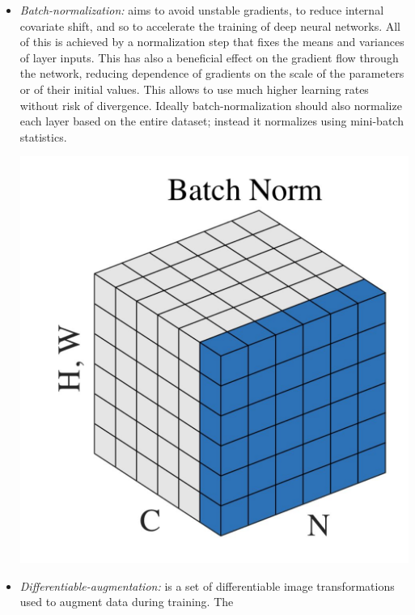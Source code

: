 \documentclass[12pt]{article}
\begin{document}
\begin{itemize}
	\item {	
		\vspace{-4cm}
		\begin{minipage}[t]{0.7\textwidth}
			\textit{Batch-normalization:} aims to avoid unstable gradients, to reduce internal covariate shift, and so to accelerate the 
			training of deep neural networks. All of this is achieved by a normalization step that fixes the means and variances of layer inputs.
			This has also a beneficial effect on the gradient flow through the network, reducing dependence of gradients on the scale of the 
			parameters or of their initial values. This allows to use much higher learning rates without risk of divergence.
			Ideally batch-normalization should also normalize each layer based on the entire dataset; instead it normalizes using mini-batch statistics.
		\end{minipage}
		\hspace{0.02\linewidth}
		\begin{minipage}{0.2\textwidth} 
			\vspace{5cm}
			\includegraphics[width=1\textwidth]{Images/batchNorm.png}
		\end{minipage}
	}
	\item {
		\textit{Differentiable-augmentation:} is a set of differentiable image transformations used to augment data during training. The
}
\end{itemize}
\end{document}
